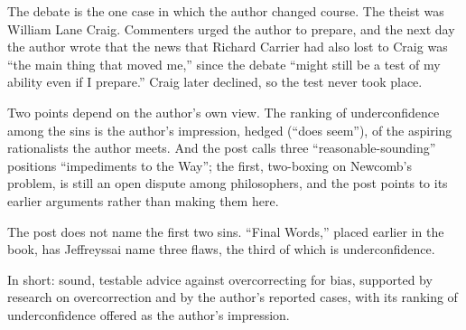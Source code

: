 \begin{afterword}
The debate is the one case in which the author changed course. The theist was William Lane Craig. Commenters urged the author to prepare, and the next day the author wrote that the news that Richard Carrier had also lost to Craig was ``the main thing that moved me,'' since the debate ``might still be a test of my ability even if I prepare.'' Craig later declined, so the test never took place.

Two points depend on the author's own view. The ranking of underconfidence among the sins is the author's impression, hedged (``does seem''), of the aspiring rationalists the author meets. And the post calls three ``reasonable-sounding'' positions ``impediments to the Way''; the first, two-boxing on Newcomb's problem, is still an open dispute among philosophers, and the post points to its earlier arguments rather than making them here.

The post does not name the first two sins. ``Final Words,'' placed earlier in the book, has Jeffreyssai name three flaws, the third of which is underconfidence.

In short: sound, testable advice against overcorrecting for bias, supported by research on overcorrection and by the author's reported cases, with its ranking of underconfidence offered as the author's impression.
\end{afterword}
